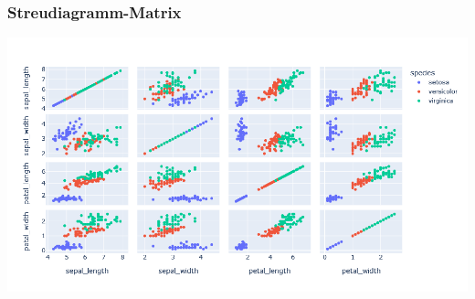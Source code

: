 \begin{frame}
\frametitle{Streudiagramm-Matrix}

\begin{center}
\includegraphics[width=\linewidth]{fig5/matrix2.png}
\end{center}
\end{frame}
